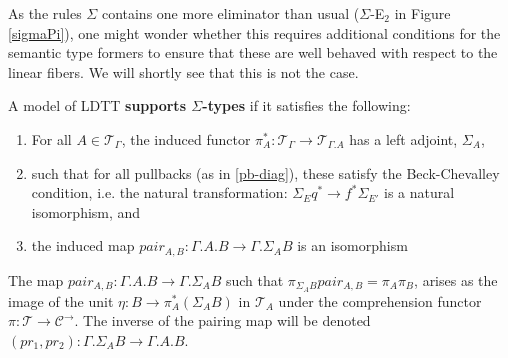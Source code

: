 \documentclass[a4paper,english]{lipics-v2018}
\begin{document}
As the rules $\Sigma$ contains one more eliminator than usual ($\Sigma$-E$_2$ in Figure \ref{sigmaPi}), one might wonder whether this requires additional conditions for the semantic type formers to ensure that these are well behaved with respect to the linear fibers. We will shortly see that this is not the case.
\begin{definition}A model of LDTT \textbf{supports $\Sigma$-types} if it satisfies the following:
  \begin{enumerate}
  \item For all $A \in \mathcal{T}_{\Gamma}$, the induced functor $\pi_A^* : \mathcal{T}_{\Gamma} \to \mathcal{T}_{\Gamma.A}$ has a left adjoint, $\Sigma_A$,
  \item such that for all pullbacks (as in \ref{pb-diag}), these satisfy the Beck-Chevalley condition, i.e. the natural transformation: $\Sigma_Eq^* \to f^*\Sigma_{E'}$ is a natural isomorphism, and
  \item the induced map $pair_{A,B} : \Gamma.A.B \to \Gamma.\Sigma_AB$ is an isomorphism
  \end{enumerate}
\end{definition}
The map $pair_{A, B} : \Gamma.A.B \to \Gamma.\Sigma_AB$ such that $\pi_{\Sigma_AB}pair_{A,B} = \pi_A\pi_B$, arises as the image of the unit $\eta : B \to \pi_A^*(\Sigma_AB)$ in $\mathcal{T}_A$ under the comprehension functor $\pi : \mathcal{T} \to \mathcal{C}^{\to}$. The inverse of the pairing map will be denoted $(pr_1, pr_2) : \Gamma.\Sigma_AB \to \Gamma.A.B$.
\end{document}
